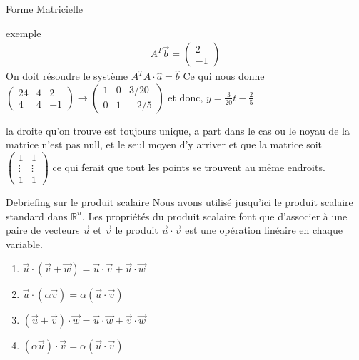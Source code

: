 \begin{parag}{Forme Matricielle}
\begin{subparag}{exemple}
\begin{align*}
                    A^T \vec{b} = \begin{pmatrix}
                        2 \\ -1
                    \end{pmatrix}
                \end{align*}
                On doit résoudre le système $A^TA \cdot \hat{a} = \hat{b} $
                Ce qui nous donne
                $\left(
                \begin{array}{cc|c}
                    24 &4 & 2  \\
                     4&4 & -1 
                \end{array}\right) \to \left(
                \begin{array}{cc|c}
                    1 &0 & 3/20  \\
                     0&1 & -2/5 
                \end{array}\right) $ et donc, $y = \frac{3}{20}t - \frac{2}{5}$
            \end{subparag}
            \begin{framedremark}
                la droite qu'on trouve est toujours unique, a part dans le cas ou le noyau de la matrice n'est pas null, et le seul moyen d'y arriver et que la matrice soit $\begin{pmatrix}
                    1 &1 \\
                    \vdots  & \vdots\\
                    1 & 1
                \end{pmatrix}$ ce qui ferait que tout les points se trouvent au même endroits.
            \end{framedremark}
        \end{parag}
        \begin{parag}{Debriefing sur le produit scalaire}
            Nous avons utilisé jusqu'ici le produit scalaire standard dans $\mathbb{R}^n$. Les propriétés du produit scalaire font que d'associer à une paire de vecteurs $\vec{u}$ et $\vec{v}$ le produit $\vec{u}\cdot \vec{v}$ est une opération linéaire en chaque variable.
            \begin{enumerate}
                \item $\vec{u}\cdot(\vec{v}+\vec{w}) = \vec{u}\cdot\vec{v} + \vec{u}\cdot\vec{w}$
                \item $\vec{u}\cdot(\alpha\vec{v}) = \alpha(\vec{u}\cdot \vec{v})$
                \item $(\vec{u}+\vec{v}) \cdot \vec{w} = \vec{u}\cdot\vec{w} + \vec{v}\cdot \vec{w}$
                \item $(\alpha\vec{u})\cdot \vec{v} = \alpha(\vec{u}\cdot\vec{v})$
            \end{enumerate}
        \end{parag}
